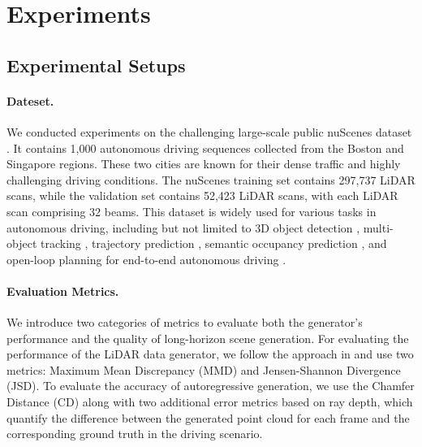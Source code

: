 \section{Experiments}
\label{sec:experiments}

\subsection{Experimental Setups}
\paragraph{Dateset.}
We conducted experiments on the challenging large-scale public nuScenes dataset \cite{caesar2020nuscenes}. 
It contains 1,000 autonomous driving sequences collected from the Boston and Singapore regions.
These two cities are known for their dense traffic and highly challenging driving conditions. 
The nuScenes training set contains 297,737 LiDAR scans, while the validation set contains 52,423 LiDAR scans, with each LiDAR scan comprising 32 beams.
This dataset is widely used for various tasks in autonomous driving, including but not limited to 3D object detection \cite{huang2021bevdet, li2023bevdepth, li2023end, li2024bevformer}, multi-object tracking \cite{hu2022monocular, pang2022simpletrack, zhang2022mutr3d}, trajectory prediction \cite{gu2023vip3d, liang2020pnpnet}, semantic occupancy prediction \cite{contributors2023openscene, tong2023scene}, and open-loop planning for end-to-end autonomous driving \cite{hu2022st, hu2023planning, jiang2023vad}.

\vspace{-4mm}
\paragraph{Evaluation Metrics.}
We introduce two categories of metrics to evaluate both the generator's performance and the quality of long-horizon scene generation.
For evaluating the performance of the LiDAR data generator, we follow the approach in \cite{LiDARGen2022} and use two metrics: Maximum Mean Discrepancy (MMD) and Jensen-Shannon Divergence (JSD).
To evaluate the accuracy of autoregressive generation, we use the Chamfer Distance (CD) \cite{fan2017point} along with two additional error metrics based on ray depth, which quantify the difference between the generated point cloud for each frame and the corresponding ground truth in the driving scenario.

